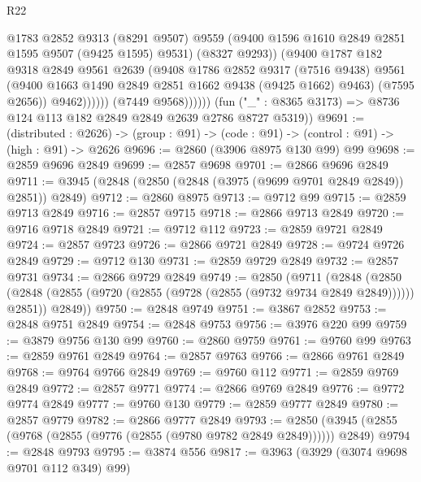\begin{lexlean}{R22}
\begin{coremodule}
                            @1783
                            @2852
                            @9313
                            (@8291 @9507)
                            @9559
                            (@9400 @1596 @1610 @2849 @2851 @1595 @9507 (@9425 @1595) @9531)
                            (@8327 @9293))
                          (@9400
                            @1787
                            @182
                            @9318
                            @2849
                            @9561
                            @2639
                            (@9408
                              @1786
                              @2852
                              @9317
                              (@7516 @9438)
                              @9561
                              (@9400 @1663 @1490 @2849 @2851 @1662 @9438 (@9425 @1662) @9463)
                              (@7595 @2656))
                            @9462))))))
                (@7449 @9568))))))
      (fun ("_" : @8365 @3173) => @8736 @124 @113 @182 @2849 @2849 @2639 @2786 @8727 @5319))
@9691 := (distributed : @2626) ->
  (group : @91) -> (code : @91) -> (control : @91) -> (high : @91) -> @2626
@9696 := @2860 (@3906 @8975 @130 @99) @99
@9698 := @2859 @9696 @2849
@9699 := @2857 @9698
@9701 := @2866 @9696 @2849
@9711 := @3945 (@2848 (@2850 (@2848 (@3975 (@9699 @9701 @2849 @2849)) @2851)) @2849)
@9712 := @2860 @8975
@9713 := @9712 @99
@9715 := @2859 @9713 @2849
@9716 := @2857 @9715
@9718 := @2866 @9713 @2849
@9720 := @9716 @9718 @2849
@9721 := @9712 @112
@9723 := @2859 @9721 @2849
@9724 := @2857 @9723
@9726 := @2866 @9721 @2849
@9728 := @9724 @9726 @2849
@9729 := @9712 @130
@9731 := @2859 @9729 @2849
@9732 := @2857 @9731
@9734 := @2866 @9729 @2849
@9749 := @2850
    (@9711
      (@2848
        (@2850 (@2848 (@2855 (@9720 (@2855 (@9728 (@2855 (@9732 @9734 @2849 @2849)))))) @2851))
        @2849))
@9750 := @2848 @9749
@9751 := @3867 @2852
@9753 := @2848 @9751 @2849
@9754 := @2848 @9753
@9756 := @3976 @220 @99
@9759 := @3879 @9756 @130 @99
@9760 := @2860 @9759
@9761 := @9760 @99
@9763 := @2859 @9761 @2849
@9764 := @2857 @9763
@9766 := @2866 @9761 @2849
@9768 := @9764 @9766 @2849
@9769 := @9760 @112
@9771 := @2859 @9769 @2849
@9772 := @2857 @9771
@9774 := @2866 @9769 @2849
@9776 := @9772 @9774 @2849
@9777 := @9760 @130
@9779 := @2859 @9777 @2849
@9780 := @2857 @9779
@9782 := @2866 @9777 @2849
@9793 := @2850 (@3945 (@2855 (@9768 (@2855 (@9776 (@2855 (@9780 @9782 @2849 @2849)))))) @2849)
@9794 := @2848 @9793
@9795 := @3874 @556
@9817 := @3963
    (@3929 (@3074 @9698 @9701 @112 @349) @99)

\end{coremodule}
\end{lexlean}
